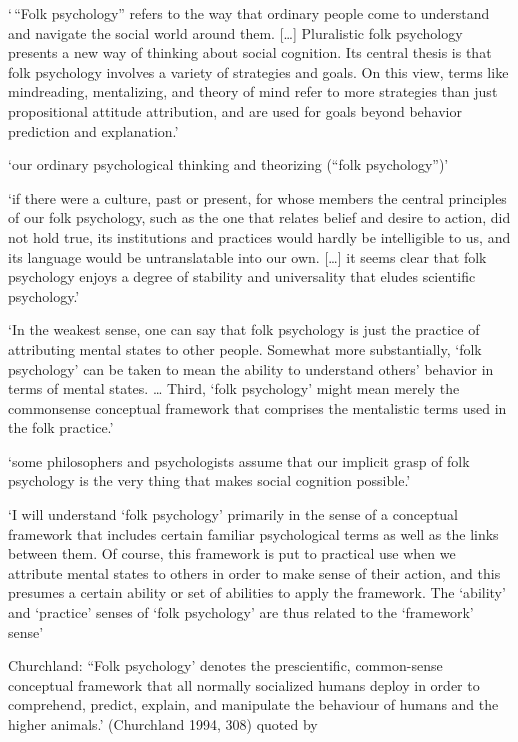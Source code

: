 \documentclass[12pt,\papersize]{extarticle}
\begin{document}
`\,``Folk psychology'' refers to the way that ordinary people come to understand and navigate the social world around them. {[}\ldots{]} Pluralistic folk psychology presents a new way of thinking about social cognition. Its central thesis is that folk psychology involves a variety of strategies and goals. On this view, terms like mindreading, mentalizing, and theory of mind refer to more strategies than just propositional attitude attribution, and are used for goals beyond behavior prediction and explanation.' \citep{andrews:2020_introduction}

`our ordinary psychological thinking and theorizing (``folk psychology'')' \citep[p.~14]{kim:2019_philosophy}

`if there were a culture, past or present, for whose members the central principles of our folk psychology, such as the one that relates belief and desire to action, did not hold true, its institutions and practices would hardly be intelligible to us, and its language would be untranslatable into our own. {[}\ldots{]} it seems clear that folk psychology enjoys a degree of stability and universality that eludes scientific psychology.' \citep[p.~110]{kim:2019_philosophy}

`In the weakest sense, one can say that folk psychology is just the practice of attributing mental states to other people. Somewhat more substantially, `folk psychology' can be taken to mean the ability to understand others' behavior in terms of mental states. \ldots{} Third, `folk psychology' might mean merely the commonsense conceptual framework that comprises the mentalistic terms used in the folk practice.' \citep[p.~2]{molder:2016_mind}

`some philosophers and psychologists assume that our implicit grasp of folk psychology is the very thing that makes social cognition possible.' \citep[p.~3]{molder:2016_mind}

`I will understand `folk psychology' primarily in the sense of a conceptual framework that includes certain familiar psychological terms as well as the links between them. Of course, this framework is put to practical use when we attribute mental states to others in order to make sense of their action, and this presumes a certain ability or set of abilities to apply the framework. The `ability' and `practice' senses of `folk psychology' are thus related to the `framework' sense' \citep[p.~5]{molder:2016_mind}

Churchland: ``Folk psychology' denotes the prescientific, common-sense conceptual framework that all normally socialized humans deploy in order to comprehend, predict, explain, and manipulate the behaviour of humans and the higher animals.' (Churchland 1994, 308) quoted by \citep[p.~4]{molder:2016_mind}
\end{document}
